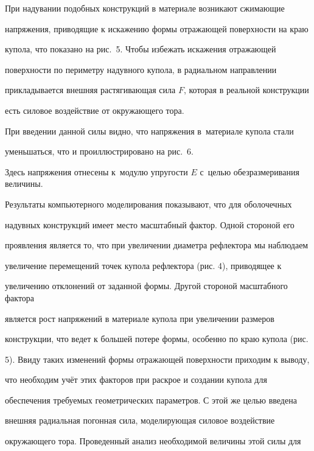 При надувании подобных конструкций в материале возникают сжимающие 

напряжения, приводящие к искажению формы отражающей поверхности на краю 

купола, что показано на рис.~5. Чтобы избежать искажения отражающей 

поверхности по периметру надувного купола, в радиальном направлении 

прикладывается внешняя растягивающая сила $F$, которая в реальной конструкции 

есть силовое воздействие от окружающего тора.



При введении данной силы видно, что напряжения в~материале купола стали 

уменьшаться, что и проиллюстрировано на рис.~6. 

Здесь напряжения отнесены к~модулю упругости $E$ с~целью обезразмеривания величины.



\smallskip




Результаты компьютерного моделирования показывают, что для оболочечных 

надувных конструкций имеет место масштабный фактор. Одной стороной его 

проявления является то, что при увеличении диаметра рефлектора мы наблюдаем 

увеличение перемещений точек купола рефлектора (рис. 4), приводящее к 

увеличению отклонений от заданной формы. Другой стороной масштабного фактора 

является рост напряжений в материале купола при увеличении размеров 

конструкции, что ведет к большей потере формы, особенно по краю купола (рис. 

5). Ввиду таких изменений формы отражающей поверхности приходим к выводу, 

что необходим учёт этих факторов при раскрое и создании купола для 

обеспечения требуемых геометрических параметров. С этой же целью введена 

внешняя радиальная погонная сила, моделирующая силовое воздействие 

окружающего тора. Проведенный анализ необходимой величины этой силы для 

